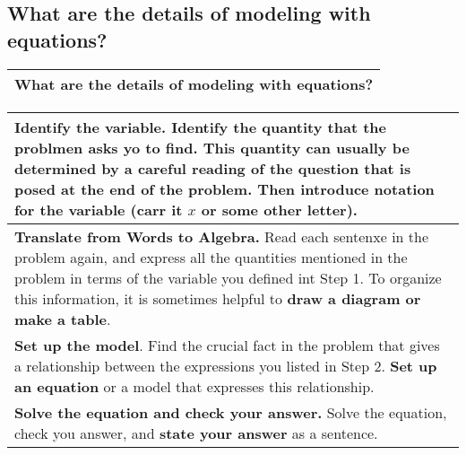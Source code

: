 \subsection{What are the details of modeling with equations?}
\begin{small}
    \begin{tabularx}{1\textwidth}{
            p{}
        }
        \toprule
        What are the details of modeling with equations?
        \\
        \bottomrule
    \end{tabularx}
\end{small}
\begin{small}
    \begin{tabularx}{1\textwidth}{
            p{}
        }
        \toprule
        \textbf{Identify the variable.}
        Identify the quantity that the problmen asks yo to find. This quantity
        can usually be determined by a careful reading of the question that is
        posed at the end of the problem. Then \textbf{introduce notation} for
        the variable (carr it $x$ or some other letter).
        \\
        \midrule
        \textbf{Translate from Words to Algebra.}
        Read each sentenxe in the problem again, and express all the quantities
        mentioned in the problem in terms of the variable you defined int Step
        1. To organize this information, it is sometimes helpful to \textbf{draw
           a diagram or make a table}.
        \\
        \midrule
        \textbf{Set up the model}.
        Find the crucial fact in the problem that gives a relationship between
        the expressions you listed in Step 2. \textbf{Set up an equation} or a
        model that expresses this relationship.
        \\
        \midrule
        \textbf{Solve the equation and check your answer.}
        Solve the equation, check you answer, and \textbf{state your answer} as
        a sentence.
        \\
        \bottomrule
    \end{tabularx}
\end{small}
